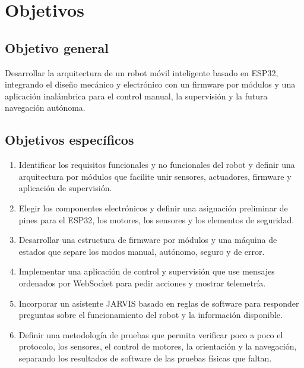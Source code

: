 \documentclass[journal]{IEEEtran}
\begin{document}
\section{Objetivos}

\subsection{Objetivo general}

Desarrollar la arquitectura de un robot móvil inteligente basado en ESP32, integrando el diseño mecánico y electrónico con un firmware por módulos y una aplicación inalámbrica para el control manual, la supervisión y la futura navegación autónoma.

\subsection{Objetivos específicos}

\begin{enumerate}[1.]
    \item Identificar los requisitos funcionales y no funcionales del robot y definir una arquitectura por módulos que facilite unir sensores, actuadores, firmware y aplicación de supervisión.

    \item Elegir los componentes electrónicos y definir una asignación preliminar de pines para el ESP32, los motores, los sensores y los elementos de seguridad.

    \item Desarrollar una estructura de firmware por módulos y una máquina de estados que separe los modos manual, autónomo, seguro y de error.

    \item Implementar una aplicación de control y supervisión que use mensajes ordenados por WebSocket para pedir acciones y mostrar telemetría.

    \item Incorporar un asistente JARVIS basado en reglas de software para responder preguntas sobre el funcionamiento del robot y la información disponible.

    \item Definir una metodología de pruebas que permita verificar poco a poco el protocolo, los sensores, el control de motores, la orientación y la navegación, separando los resultados de software de las pruebas físicas que faltan.
\end{enumerate}
\end{document}
